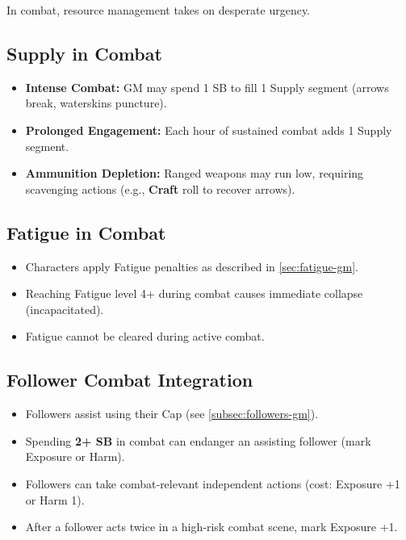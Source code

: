 In combat, resource management takes on desperate urgency.

\subsection{Supply in Combat}
\label{subsec:combat-supply}

\begin{itemize}
  \item \textbf{Intense Combat:} GM may spend 1 SB to fill 1 Supply segment (arrows break, waterskins puncture).
  \item \textbf{Prolonged Engagement:} Each hour of sustained combat adds 1 Supply segment.
  \item \textbf{Ammunition Depletion:} Ranged weapons may run low, requiring scavenging actions (e.g., \textbf{Craft} roll to recover arrows).
\end{itemize}

\subsection{Fatigue in Combat}
\label{subsec:combat-fatigue}

\begin{itemize}
  \item Characters apply Fatigue penalties as described in \ref{sec:fatigue-gm}.
  \item Reaching Fatigue level 4+ during combat causes immediate collapse (incapacitated).
  \item Fatigue cannot be cleared during active combat.
\end{itemize}

\subsection{Follower Combat Integration}
\label{subsec:combat-followers}

\begin{itemize}
  \item Followers assist using their Cap (see \ref{subsec:followers-gm}).
  \item Spending \textbf{2+ SB} in combat can endanger an assisting follower (mark Exposure or Harm).
  \item Followers can take combat‑relevant independent actions (cost: Exposure +1 or Harm 1).
  \item After a follower acts twice in a high‑risk combat scene, mark Exposure +1.
\end{itemize}

